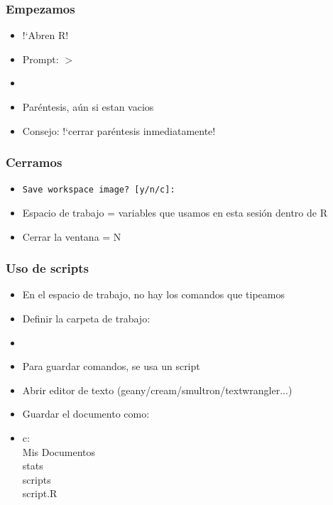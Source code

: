 \documentclass[mathserif]{beamer}
\begin{document}
\begin{frame}[plain,label=d4]%
   \frametitle{Empezamos}
   \begin{itemize}
      \item !`Abren R! 
      \item Prompt: \alert{$>$}
      \item \texttt{}
      \item Par\'entesis, a\'un si estan vacios
      \item Consejo: !`cerrar par\'entesis inmediatamente!
   \end{itemize}
\end{frame}%

\begin{frame}[plain,label=d5]%
   \frametitle{Cerramos}
   \begin{itemize}
      \item \texttt{Save workspace image? [y/n/c]:} 
      \item Espacio de trabajo = variables que usamos en esta sesi\'on dentro de R
      \item Cerrar la ventana = N
   \end{itemize}
\end{frame}%

\begin{frame}[plain,label=d6]%
   \frametitle{Uso de scripts}
   \begin{itemize}
      \item En el espacio de trabajo, no hay los comandos que tipeamos
      \item Definir la carpeta de trabajo: 
      \item {}
      \item Para guardar comandos, se usa un script
      \item Abrir editor de texto (geany/cream/smultron/textwrangler...)
      \item Guardar el documento como:
      \item \begin{semiverbatim} c:\\Mis Documentos\\stats\\scripts\\script.R \end{semiverbatim}
   \end{itemize}
\end{frame}%
\end{document}
